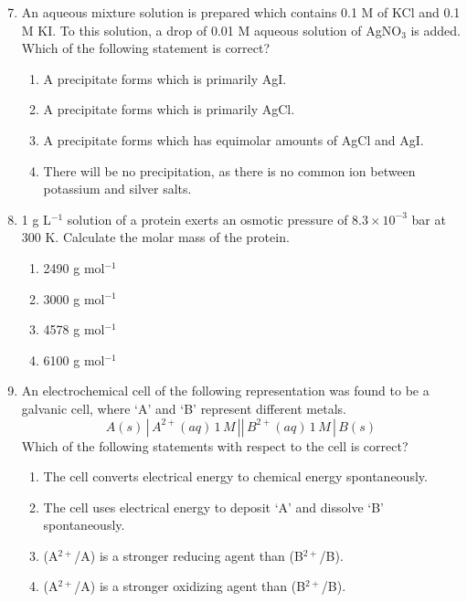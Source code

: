 \documentclass[journal,12pt,onecolumn]{IEEEtran}
\begin{document}
\begin{enumerate}
\setcounter{enumi}{6}
    \item An aqueous mixture solution is prepared which contains 0.1 M of KCl and 0.1 M KI. To this solution, a drop of 0.01 M aqueous solution of AgNO$_3$ is added. Which of the following statement is correct?  
    \begin{multicols}{2}
    \begin{enumerate}[label=(\Alph*)]
        \item A precipitate forms which is primarily AgI.  
        \item A precipitate forms which is primarily AgCl.  
        \item A precipitate forms which has equimolar amounts of AgCl and AgI.  
        \item There will be no precipitation, as there is no common ion between potassium and silver salts.  
    \end{enumerate}
    \end{multicols}

    \item 1 g L$^{-1}$ solution of a protein exerts an osmotic pressure of $8.3 \times 10^{-3}$ bar at 300 K. Calculate the molar mass of the protein.  
    \begin{multicols}{2}
    \begin{enumerate}[label=(\Alph*)]
        \item 2490 g mol$^{-1}$  
        \item 3000 g mol$^{-1}$  
        \item 4578 g mol$^{-1}$  
        \item 6100 g mol$^{-1}$  
    \end{enumerate}
    \end{multicols}
    \item An electrochemical cell of the following representation was found to be a galvanic cell, where ‘A’ and ‘B’ represent different metals.  
    \[
    A (s) \,|\, A^{2+} (aq) \, 1\,M \,||\, B^{2+} (aq) \, 1\,M \,|\, B(s)
    \]  
    Which of the following statements with respect to the cell is correct?  
    \begin{multicols}{2}
    \begin{enumerate}[label=(\Alph*)]
        \item The cell converts electrical energy to chemical energy spontaneously.
        \item The cell uses electrical energy to deposit ‘A’ and dissolve ‘B’ spontaneously.
        \item (A$^{2+}$/A) is a stronger reducing agent than (B$^{2+}$/B).
        \item (A$^{2+}$/A) is a stronger oxidizing agent than (B$^{2+}$/B).
    \end{enumerate}
    \end{multicols}


\end{enumerate}
\end{document}
